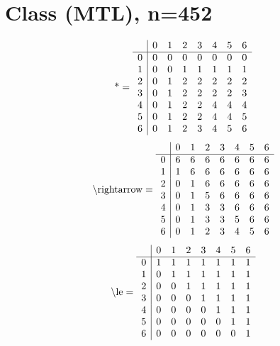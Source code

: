\documentclass[11pt]{article}
\begin{document}
\section{Class (MTL), n=452}
\[\text{*} = 
\begin{array}{r | r r r r r r r}
 & 0 & 1 & 2 & 3 & 4 & 5 & 6 \\ \hline
0 & 0 & 0 & 0 & 0 & 0 & 0 & 0 \\
1 & 0 & 0 & 1 & 1 & 1 & 1 & 1 \\
2 & 0 & 1 & 2 & 2 & 2 & 2 & 2 \\
3 & 0 & 1 & 2 & 2 & 2 & 2 & 3 \\
4 & 0 & 1 & 2 & 2 & 4 & 4 & 4 \\
5 & 0 & 1 & 2 & 2 & 4 & 4 & 5 \\
6 & 0 & 1 & 2 & 3 & 4 & 5 & 6 \\
\end{array}
\]
\[\text{\textbackslash rightarrow} = 
\begin{array}{r | r r r r r r r}
 & 0 & 1 & 2 & 3 & 4 & 5 & 6 \\ \hline
0 & 6 & 6 & 6 & 6 & 6 & 6 & 6 \\
1 & 1 & 6 & 6 & 6 & 6 & 6 & 6 \\
2 & 0 & 1 & 6 & 6 & 6 & 6 & 6 \\
3 & 0 & 1 & 5 & 6 & 6 & 6 & 6 \\
4 & 0 & 1 & 3 & 3 & 6 & 6 & 6 \\
5 & 0 & 1 & 3 & 3 & 5 & 6 & 6 \\
6 & 0 & 1 & 2 & 3 & 4 & 5 & 6 \\
\end{array}
\]
\[\text{\textbackslash le} = 
\begin{array}{r | r r r r r r r}
 & 0 & 1 & 2 & 3 & 4 & 5 & 6 \\ \hline
0 & 1 & 1 & 1 & 1 & 1 & 1 & 1 \\
1 & 0 & 1 & 1 & 1 & 1 & 1 & 1 \\
2 & 0 & 0 & 1 & 1 & 1 & 1 & 1 \\
3 & 0 & 0 & 0 & 1 & 1 & 1 & 1 \\
4 & 0 & 0 & 0 & 0 & 1 & 1 & 1 \\
5 & 0 & 0 & 0 & 0 & 0 & 1 & 1 \\
6 & 0 & 0 & 0 & 0 & 0 & 0 & 1 \\
\end{array}
\]
\end{document}
